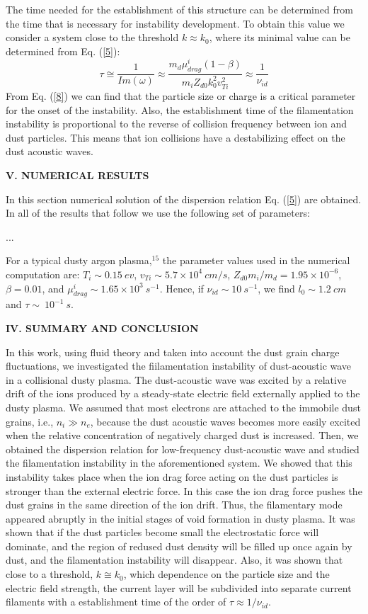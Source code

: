 The time needed for the establishment of this structure can be
determined from the time that is necessary for instability
development. To obtain this value we consider a system close to the
threshold $k\approx k_{0}$, where its minimal value can be
determined from Eq. (\ref{5}):
\begin{equation}\label{15}
\tau\cong \frac{1}{Im(\omega)}\approx\frac{m_{d}\mu_{drag}^{i}(1-\beta)}{m_{i}Z_{d0}k_0^{2}v_{Ti}^{2}}\approx\frac{1}{\nu_{id}}
\end{equation}
From Eq. (\ref{8}) we can find that the particle size or charge is a
critical parameter for the onset of the instability. Also,  the
establishment time of the filamentation instability is proportional
to the reverse of collision frequency between ion and dust
particles. This means that ion collisions have a destabilizing
effect on the dust acoustic waves.

\vskip 1cm {\bf\large V. NUMERICAL RESULTS }\vskip 0.5cm

In this section numerical solution of the dispersion relation Eq.
(\ref{5}) are obtained. In all of the results that follow we use the
following set of parameters:

...

For a typical dusty argon plasma,$^{15}$ the parameter values used
in the numerical computation are: $T_{i}\sim 0.15~ev$, $v_{Ti}\sim
5.7\times 10^4~cm/s$, $Z_{d0}m_{i}/m_d=1.95\times 10^{-6}$,
$\beta=0.01$, and $\mu_{drag}^i\sim1.65\times10^3~s^{-1}$. Hence, if
$\nu_{id}\sim10~s^{-1}$, we find $l_0\sim1.2~cm$ and
$\tau\sim~10^{-1}~s$.


\vskip 1cm {\bf\large IV. SUMMARY AND CONCLUSION }\vskip 0.5cm

In this work, using fluid theory and taken into account the dust
grain charge fluctuations, we investigated the fiilamentation
instability of dust-acoustic wave in a collisional dusty plasma. The
dust-acoustic wave was excited by a relative drift of the ions
produced by a steady-state electric field externally applied to the
dusty plasma. We assumed that most electrons are attached to the
immobile dust grains, i.e., $n_{i}\gg n_{e}$, because the dust
acoustic waves becomes more easily excited when the relative
concentration of negatively charged dust is increased. Then, we
obtained the dispersion relation for low-frequency dust-acoustic
wave and studied the filamentation instability in the aforementioned
system. We showed that this instability takes place when the ion
drag force acting on the dust particles is stronger than the
external electric force. In this case the ion drag force pushes the
dust grains in the same direction of  the ion drift. Thus, the
filamentary mode appeared abruptly in the initial stages of void
formation in dusty plasma. It was shown that if the dust particles
become small the electrostatic force will dominate, and the region
of redused dust density will be filled up once again by dust, and
the filamentation instability will disappear.  Also, it was shown
that close to a threshold, $k\cong k_{0}$, which dependence on the
particle size and the electric field strength, the current layer
will be subdivided into separate current filaments with a
establishment time of the order of $\tau  \approx 1/\nu_{id}$.

